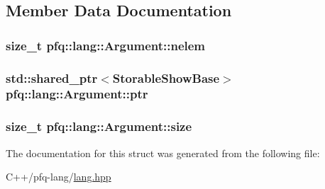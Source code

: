\subsection{Member Data Documentation}
\hypertarget{structpfq_1_1lang_1_1Argument_a124d3646401b91728340221c59ca884e}{
\subsubsection[{nelem}]{\setlength{\rightskip}{0pt plus 5cm}size\+\_\+t pfq\+::lang\+::\+Argument\+::nelem}}\label{structpfq_1_1lang_1_1Argument_a124d3646401b91728340221c59ca884e}
\hypertarget{structpfq_1_1lang_1_1Argument_a74137962d82bf5a018d684c04149e446}{
\subsubsection[{ptr}]{\setlength{\rightskip}{0pt plus 5cm}std\+::shared\+\_\+ptr$<${\bf Storable\+Show\+Base}$>$ pfq\+::lang\+::\+Argument\+::ptr}}\label{structpfq_1_1lang_1_1Argument_a74137962d82bf5a018d684c04149e446}
\hypertarget{structpfq_1_1lang_1_1Argument_a0ce45c4283dc6a97dbf142cb9de211df}{
\subsubsection[{size}]{\setlength{\rightskip}{0pt plus 5cm}size\+\_\+t pfq\+::lang\+::\+Argument\+::size}}\label{structpfq_1_1lang_1_1Argument_a0ce45c4283dc6a97dbf142cb9de211df}


The documentation for this struct was generated from the following file\+:\begin{DoxyCompactItemize}
\item 
C++/pfq-\/lang/\hyperlink{lang_8hpp}{lang.\+hpp}\end{DoxyCompactItemize}
